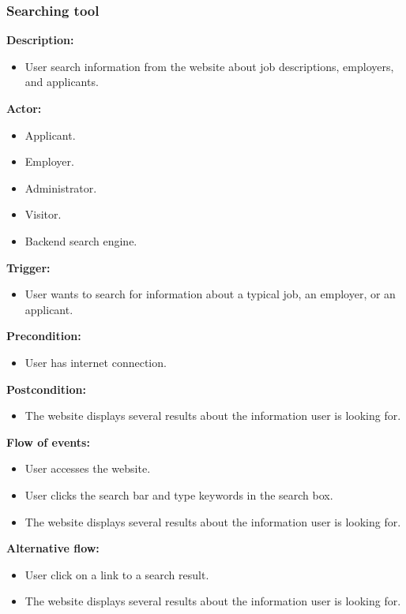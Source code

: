 \documentclass[a4paper]{article}
\begin{document}
\subsubsection{Searching tool}
\textbf{Description:}
\begin{itemize}
  \item User search information from the website about job descriptions, employers, and applicants.
\end{itemize}

\textbf{Actor:}
\begin{itemize}
  \item Applicant.
  \item Employer.
  \item Administrator.
  \item Visitor.
  \item Backend search engine.
\end{itemize}

\textbf{Trigger:}
\begin{itemize}
  \item User wants to search for information about a typical job, an employer, or an applicant.
\end{itemize}

\textbf{Precondition:}
\begin{itemize}
  \item User has internet connection.
\end{itemize}

\textbf{Postcondition:}
\begin{itemize}
  \item The website displays several results about the information user is looking for.
\end{itemize}

\textbf{Flow of events:}
\begin{itemize}
  \item User accesses the website.
  \item User clicks the search bar and type keywords in the search box.
  \item The website displays several results about the information user is looking for.
\end{itemize}

\textbf{Alternative flow:}
\begin{itemize}
  \item User click on a link to a search result.
  \item The website displays several results about the information user is looking for.
\end{itemize}
\end{document}
